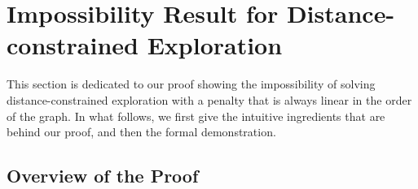 \documentclass[11pt]{article}
\begin{document}
\section{Impossibility Result for Distance-constrained Exploration}\label{sec:imp}

This section is dedicated to our proof showing the impossibility of solving distance-constrained exploration with a penalty that is always linear in the order of the graph. In what follows, we first give the intuitive ingredients that are behind our proof, and then the formal demonstration.


\subsection{Overview of the Proof}
\label{sec:int}
\end{document}
